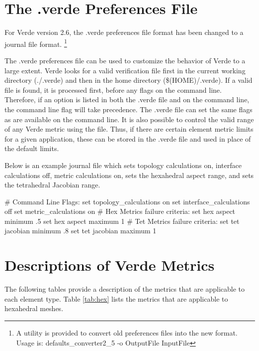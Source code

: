 \documentclass[10pt]{report}
\begin{document}
\T\begin{appendix}
\chapter{The .verde Preferences File}
\label{sec:verde_prefs}

For Verde version 2.6, the .verde preferences file format has been changed
to a journal file format.  \footnote { A utility is provided to convert old
 preferences files into the new format.  Usage is: defaults\_converter2\_5 
-o OutputFile InputFile }

The .verde preferences file can be used to customize the behavior of 
Verde to a large extent.  Verde looks for a valid verification file 
first in the current working directory (./.verde) and then in the home 
directory (\$(HOME)/.verde).  If a valid file is found, it is processed 
first, before any flags on the command line.  Therefore, if an option 
is listed in both the .verde file and on the command line, the command 
line flag will take precedence.  The .verde file can set the same flags 
as are available on the command line.  It is also possible to control 
the valid range of any Verde metric using the file.  Thus, if there are 
certain element metric limits for a given application, these can be 
stored in the .verde file and used in place of the default limits.

Below is an example journal file which sets topology calculations on, 
interface calculations off, metric calculations on, sets the hexahedral 
aspect range, and sets the tetrahedral Jacobian range.

\begin{example}
# Command Line Flags:
set topology\_calculations on
set interface\_calculations off
set metric\_calculations on
# Hex Metrics failure criteria:
set hex aspect minimum .5
set hex aspect maximum 1
# Tet Metrics failure criteria:
set tet jacobian minimum .8
set tet jacobian maximum 1

\end{example}


\T\newpage
\chapter{Descriptions of Verde Metrics}
\label{sec:appendix_B}


The following tables provide a description of the metrics that
are applicable to each element type.  Table \ref{tab:hex}
lists the metrics that are applicable to hexahedral meshes.  


\end{appendix}
\end{document}
